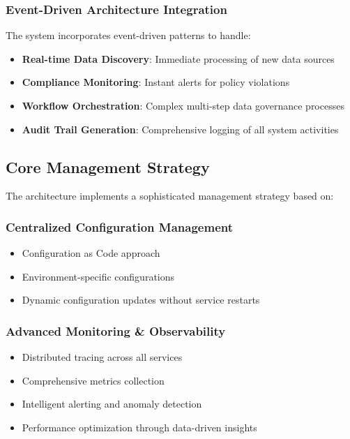 \documentclass[12pt,a4paper]{article}
\begin{document}
\subsubsection{Event-Driven Architecture Integration}

The system incorporates event-driven patterns to handle:

\begin{itemize}
    \item \textbf{Real-time Data Discovery}: Immediate processing of new data sources
    \item \textbf{Compliance Monitoring}: Instant alerts for policy violations
    \item \textbf{Workflow Orchestration}: Complex multi-step data governance processes
    \item \textbf{Audit Trail Generation}: Comprehensive logging of all system activities
\end{itemize}

\subsection{Core Management Strategy}

The architecture implements a sophisticated management strategy based on:

\subsubsection{Centralized Configuration Management}
\begin{itemize}
    \item Configuration as Code approach
    \item Environment-specific configurations
    \item Dynamic configuration updates without service restarts
\end{itemize}

\subsubsection{Advanced Monitoring \& Observability}
\begin{itemize}
    \item Distributed tracing across all services
    \item Comprehensive metrics collection
    \item Intelligent alerting and anomaly detection
    \item Performance optimization through data-driven insights
\end{itemize}
\end{document}
